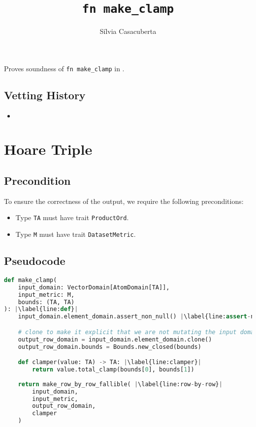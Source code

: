 \documentclass{article}
\title{\texttt{fn make\_clamp}}
\author{S\'ilvia Casacuberta}
\date{}
\begin{document}
\maketitle

\contrib
Proves soundness of \texttt{fn make\_clamp} in .

\subsection*{Vetting History}
\begin{itemize}
    \item {}
\end{itemize}

\section{Hoare Triple}
\subsection*{Precondition}
To ensure the correctness of the output, we require the following preconditions:

\begin{itemize}
    \item Type \texttt{TA} must have trait \texttt{ProductOrd}.
    \item Type \texttt{M} must have trait \texttt{DatasetMetric}.
\end{itemize}

\subsection*{Pseudocode}
\begin{lstlisting}[language=Python, escapechar=|] 
def make_clamp(
    input_domain: VectorDomain[AtomDomain[TA]], 
    input_metric: M, 
    bounds: (TA, TA)
): |\label{line:def}|
    input_domain.element_domain.assert_non_null() |\label{line:assert-non-null}|

    # clone to make it explicit that we are not mutating the input domain
    output_row_domain = input_domain.element_domain.clone()
    output_row_domain.bounds = Bounds.new_closed(bounds)

    def clamper(value: TA) -> TA: |\label{line:clamper}|
        return value.total_clamp(bounds[0], bounds[1])
    
    return make_row_by_row_fallible( |\label{line:row-by-row}|
        input_domain, 
        input_metric, 
        output_row_domain, 
        clamper
    )
\end{lstlisting}
\end{document}
